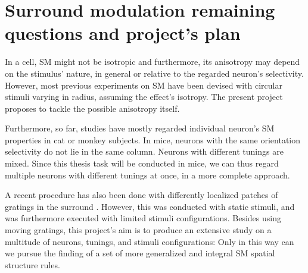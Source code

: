 \label{cap:conclusions}


\section{Surround modulation remaining questions and project's plan} \label{Plan}

In a cell, SM might not be isotropic and furthermore, its anisotropy may depend on the stimulus' nature, in general or relative to the regarded neuron's selectivity. However, most previous experiments on SM have been devised with circular stimuli varying in radius, assuming the effect's isotropy. The present project proposes to tackle the possible anisotropy itself.

Furthermore, so far, studies have mostly regarded individual neuron's SM properties in cat or monkey subjects. In mice, neurons with the same orientation selectivity do not lie in the same column. Neurons with different tunings are mixed. Since this thesis task will be conducted in mice, we can thus regard multiple neurons with different tunings at once, in a more complete approach.

A recent procedure has also been done with differently localized patches of gratings in the surround \cite{SManisotropy}. However, this was conducted with static stimuli, and was furthermore executed with limited stimuli configurations. Besides using moving gratings, this project's aim is to produce an extensive study on a multitude of neurons, tunings, and stimuli configurations: Only in this way can we pursue the finding of a set of more generalized and integral SM spatial structure rules.

